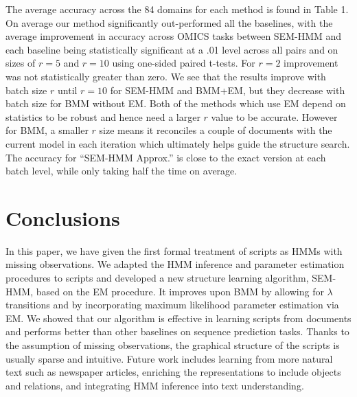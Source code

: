\documentclass[letterpaper]{article}
\begin{document}
The average accuracy across the 84 domains for each method is found in Table 1.
On average our method significantly out-performed all the baselines, with the average improvement in accuracy across OMICS tasks between SEM-HMM and each baseline being statistically significant at a .01 level across all pairs and on sizes of $r = 5$ and $r= 10$ using one-sided paired t-tests.  For $r=2$ improvement was not statistically greater than zero. %
We see that the results improve with batch size $r$ until $r=10$ for
SEM-HMM and BMM+EM, but they decrease with batch size for BMM without EM.
Both of the methods which use EM depend on statistics to be robust and hence need a larger $r$ value to be accurate.  However for BMM, a smaller $r$ size means it reconciles a couple of documents with the current model in each iteration which ultimately helps guide the structure search.
The accuracy for ``SEM-HMM Approx.'' is close to the exact version at each batch level, while only taking half the time on average.




\section{Conclusions}

In this paper, we have given the first formal treatment of scripts as
HMMs with missing observations.
We adapted the HMM inference and parameter estimation procedures
to scripts and developed a new structure
learning algorithm, SEM-HMM, based on the EM procedure.
It improves upon BMM by allowing for $\lambda$ transitions and by
incorporating maximum likelihood parameter estimation via EM.
We showed that our algorithm is effective in learning scripts from
documents and performs better than
other baselines on sequence prediction tasks. Thanks to the
assumption of missing observations, the graphical
structure of the scripts is usually sparse and intuitive.
Future work includes learning from more natural text such as
newspaper articles, enriching the representations to include objects and
relations, and integrating HMM inference into text understanding.
\end{document}
